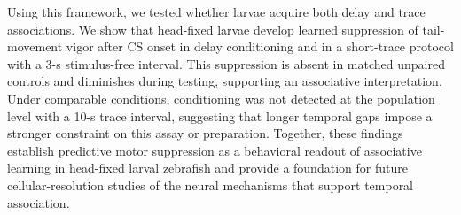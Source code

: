 Using this framework, we tested whether larvae acquire both delay and trace associations. We show that head-fixed larvae develop learned suppression of tail-movement vigor after CS onset in delay conditioning and in a short-trace protocol with a 3-s stimulus-free interval. This suppression is absent in matched unpaired controls and diminishes during testing, supporting an associative interpretation. Under comparable conditions, conditioning was not detected at the population level with a 10-s trace interval, suggesting that longer temporal gaps impose a stronger constraint on this assay or preparation. Together, these findings establish predictive motor suppression as a behavioral readout of associative learning in head-fixed larval zebrafish and provide a foundation for future cellular-resolution studies of the neural mechanisms that support temporal association.
